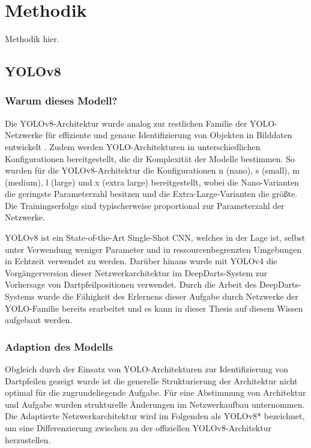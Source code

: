 
\section{Methodik}
\label{sec:ki:methodik}

Methodik hier.

\subsection{YOLOv8}
\label{sec:warum_yolov8}

\subsubsection{Warum dieses Modell?}

Die YOLOv8-Architektur wurde analog zur restlichen Familie der YOLO-Netzwerke für effiziente und genaue Identifizierung von Objekten in Bilddaten entwickelt \cite{yolov8_paper}. Zudem werden YOLO-Architekturen in unterschiedlichen Konfigurationen bereitgestellt, die dir Komplexität der Modelle bestimmen. So wurden für die YOLOv8-Architektur die Konfigurationen n (nano), s (small), m (medium), l (large) und x (extra large) bereitgestellt, wobei die Nano-Varianten die geringste Parameterzahl besitzen und die Extra-Large-Varianten die größte. Die Trainingserfolge sind typischerweise proportional zur Parameterzahl der Netzwerke.

YOLOv8 ist ein State-of-the-Art Single-Shot CNN, welches in der Lage ist, selbst unter Verwendung weniger Parameter und in ressourcenbegrenzten Umgebungen in Echtzeit verwendet zu werden. Darüber hinaus wurde mit YOLOv4 die Vorgängerversion dieser Netzwerkarchitektur im DeepDarts-System zur Vorhersage von Dartpfeilpositionen verwendet. Durch die Arbeit des DeepDarts-Systems wurde die Fähigkeit des Erlernens dieser Aufgabe durch Netzwerke der YOLO-Familie bereits erarbeitet und es kann in dieser Thesis auf diesem Wissen aufgebaut werden.

\subsubsection{Adaption des Modells}
\label{sec:yolo_adaption}

Obgleich durch \citeauthor{deepdarts} der Einsatz von YOLO-Architekturen zur Identifizierung von Dartpfeilen gezeigt wurde ist die generelle Strukturierung der Architektur nicht optimal für die zugrundeliegende Aufgabe. Für eine Abstimmung von Architektur und Aufgabe wurden strukturelle Änderungen im Netzwerkaufbau unternommen. Die Adaptierte Netzwerkarchitektur wird im Folgenden als YOLOv8* bezeichnet, um eine Differenzierung zwischen zu der offiziellen YOLOv8-Architektur herzustellen.

